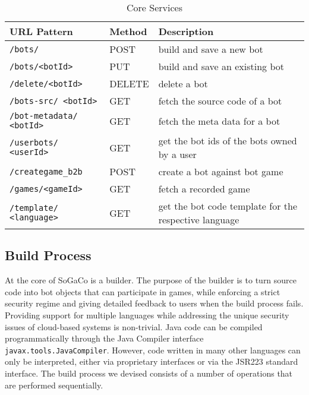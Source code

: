 \begin{table}[!h]
	\centering
	\caption{Core Services}
	\label{tab:services}
	\begin{tabular}{p{2.6cm}p{0.8cm}p{3.9cm}}
		\hline
		URL Pattern & Method & Description \\
		\hline
		\texttt{/bots/}	 & POST & build and save a new bot\\
		
		\texttt{/bots/\textless botId\textgreater}   & PUT  & build and save an existing bot\\
				
		\texttt{/delete/\-\textless botId\textgreater  } & DELETE  & delete a bot \\ 
		
		\texttt{/bots-src/ \textless botId\textgreater} & GET  & fetch the source code of a bot\\
				
		\texttt{/bot-metadata/ \textless botId\textgreater} & GET & fetch the meta data for a bot \\
		
		\texttt{/userbots/ \textless userId\textgreater} & GET  & get the bot ids of the bots owned by a user  \\
				
		\texttt{/creategame\_b2b}  & POST  & create a bot against bot game\\
		
		\texttt{/games/\textless gameId\textgreater} & GET & fetch a recorded game \\
		
		\texttt{/template/ \textless language\textgreater}   & GET  & get the bot code template for the respective language \\   
		\hline                                                                  
	\end{tabular}
\end{table}



\subsection{Build Process}


At the core of SoGaCo is a builder. The purpose of the builder is to turn source code into bot objects that can participate in games, while enforcing a strict security regime and giving detailed feedback to users when the build process fails.
Providing support for multiple languages while addressing the unique security issues of cloud-based systems is non-trivial. Java code can be compiled programmatically through the Java Compiler interface \texttt{javax.tools.JavaCompiler}. However, code written in many other languages can only be interpreted, either via proprietary interfaces or via the JSR223 \cite{grogan2006jsr} standard interface. The build process we devised consists of a number of operations that are performed sequentially.


